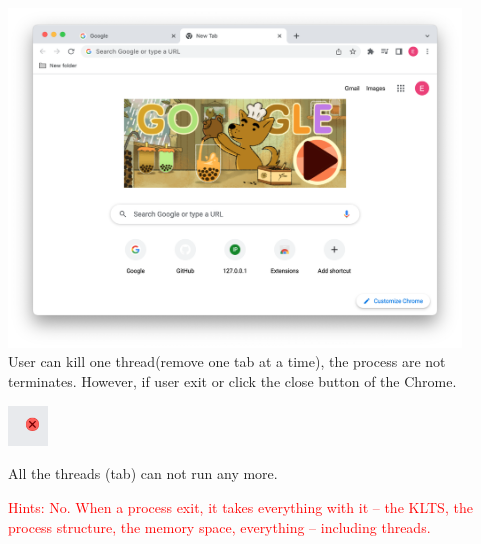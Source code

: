 \documentclass[12pt]{article}
\newenvironment{sol}[1][Solution]{\begin{trivlist}\item[\hskip\labelsep {\bfseries #1:}]}{\end{trivlist}}
\begin{document}
\begin{enumerate}
\begin{sol}
    \includegraphics[width=0.9\textwidth]{problem7b.png}\\
    User can kill one thread(remove one tab at a time), the process are not terminates. However, if user exit or click the close button of the Chrome.\\
    \begin{center}
        \includegraphics[width=0.08\textwidth]{problem7c.png}
    \end{center}
    All the threads (tab) can not run any more.
    
    
\end{sol}
\textcolor{red}{Hints: No. When a process exit, it takes everything with it -- the KLTS, the process structure, the memory space, everything -- including threads.}

\end{enumerate}
\end{document}
